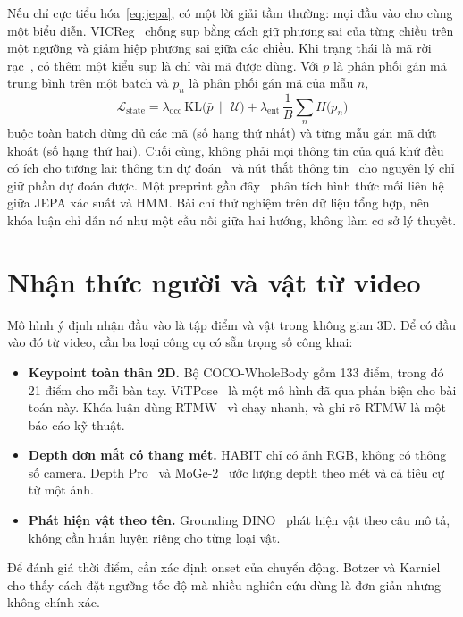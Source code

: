 Nếu chỉ cực tiểu hóa~\eqref{eq:jepa}, có một lời giải tầm thường: mọi đầu vào cho cùng một biểu diễn. VICReg~\cite{bardes2022vicreg} chống sụp bằng cách giữ phương sai của từng chiều trên một ngưỡng và giảm hiệp phương sai giữa các chiều. Khi trạng thái là mã rời rạc~\cite{vandenoord2017vqvae}, có thêm một kiểu sụp là chỉ vài mã được dùng. Với $\bar p$ là phân phối gán mã trung bình trên một batch và $p_n$ là phân phối gán mã của mẫu $n$,
\begin{equation}
  \mathcal{L}_{\text{state}}=\lambda_{\text{occ}}\,\mathrm{KL}\big(\bar p\,\big\|\,\mathcal{U}\big)
  +\lambda_{\text{ent}}\,\frac{1}{B}\sum_n H\big(p_n\big)
  \label{eq:state-reg}
\end{equation}
buộc toàn batch dùng đủ các mã (số hạng thứ nhất) và từng mẫu gán mã dứt khoát (số hạng thứ hai). Cuối cùng, không phải mọi thông tin của quá khứ đều có ích cho tương lai: thông tin dự đoán~\cite{bialek2001predictability} và nút thắt thông tin~\cite{alemi2017vib} cho nguyên lý chỉ giữ phần dự đoán được. Một preprint gần đây~\cite{huang2026jepahmm} phân tích hình thức mối liên hệ giữa JEPA xác suất và HMM. Bài chỉ thử nghiệm trên dữ liệu tổng hợp, nên khóa luận chỉ dẫn nó như một cầu nối giữa hai hướng, không làm cơ sở lý thuyết.

\section{Nhận thức người và vật từ video}
\label{sec:bg-perception}

Mô hình ý định nhận đầu vào là tập điểm và vật trong không gian 3D. Để có đầu vào đó từ video, cần ba loại công cụ có sẵn trọng số công khai:
\begin{itemize}
  \item \textbf{Keypoint toàn thân 2D.} Bộ COCO-WholeBody gồm 133 điểm, trong đó 21 điểm cho mỗi bàn tay. ViTPose~\cite{xu2022vitpose} là một mô hình đã qua phản biện cho bài toán này. Khóa luận dùng RTMW~\cite{jiang2024rtmw} vì chạy nhanh, và ghi rõ RTMW là một báo cáo kỹ thuật.
  \item \textbf{Depth đơn mắt có thang mét.} HABIT chỉ có ảnh RGB, không có thông số camera. Depth Pro~\cite{bochkovskii2025depthpro} và MoGe-2~\cite{wang2025moge2} ước lượng depth theo mét và cả tiêu cự từ một ảnh.
  \item \textbf{Phát hiện vật theo tên.} Grounding DINO~\cite{liu2024groundingdino} phát hiện vật theo câu mô tả, không cần huấn luyện riêng cho từng loại vật.
\end{itemize}
Để đánh giá thời điểm, cần xác định onset của chuyển động. Botzer và Karniel~\cite{botzer2009onset} cho thấy cách đặt ngưỡng tốc độ mà nhiều nghiên cứu dùng là đơn giản nhưng không chính xác.

